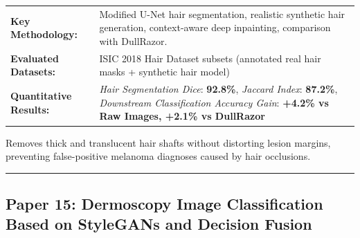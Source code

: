 \documentclass[10pt,a4paper]{article}
\begin{document}
\vspace{4pt}
\begin{tabularx}{\linewidth}{p{3.2cm}X}
\toprule
\textbf{Key Methodology:} & Modified U-Net hair segmentation, realistic synthetic hair generation, context-aware deep inpainting, comparison with DullRazor. \\
\textbf{Evaluated Datasets:} & ISIC 2018 Hair Dataset subsets (annotated real hair masks + synthetic hair model) \\
\textbf{Quantitative Results:} & \textit{Hair Segmentation Dice}: \textbf{92.8\%}, \textit{Jaccard Index}: \textbf{87.2\%}, \textit{Downstream Classification Accuracy Gain}: \textbf{+4.2\% vs Raw Images, +2.1\% vs DullRazor} \\
\bottomrule
\end{tabularx}
\vspace{4pt}
\begin{tcolorbox}[utilitybox,title=Clinical Utility and Real-World Impact]
Removes thick and translucent hair shafts without distorting lesion margins, preventing false-positive melanoma diagnoses caused by hair occlusions.
\end{tcolorbox}
\vspace{12pt}
\hrule
\vspace{12pt}
\subsection*{Paper 15: Dermoscopy Image Classification Based on StyleGANs and Decision Fusion}
\end{document}

